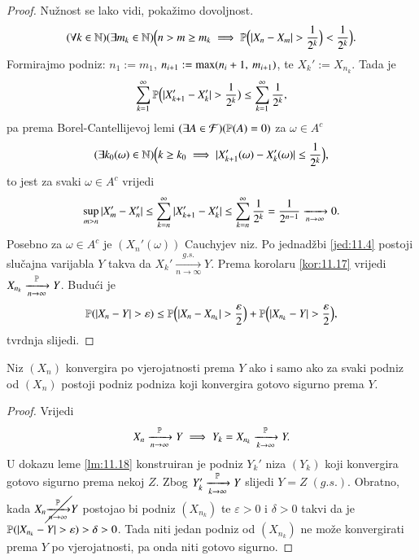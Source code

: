 \begin{proof}
    Nu\v znost se lako vidi, poka\v zimo dovoljnost.
    \begin{equation*}
        (\forall k \in \nat)(\exists m_k \in \nat)\Big(n > m \geq m_k \implies \masP \Big( |X_n - X_m|>\frac{1}{2^k} \Big) < \frac{1}{2^k} \Big).
    \end{equation*}
    Formirajmo podniz: $n_1 := m_1$, $n_{i + 1} := \max ({n_i + 1}, \: {m_{i + 1}})$, te $X_k' := X_{n_k}$.
    Tada je
    \begin{equation*}
        \sum\limits_{k = 1}^{\infty} \mathbb{P} \Big( |X_{k + 1}' - X_k'| > \frac{1}{2^k} \big) \leq \sum\limits_{k = 1}^{\infty} \frac{1}{2^k},    
    \end{equation*}
    pa prema Borel-Cantellijevoj lemi $(\exists A \in \mathcal{F}) (\mathbb{P}({A}) = 0)$ za $\omega \in A^c$
    \begin{equation*}
        (\exists k_0 (\omega) \in \mathbb{N}) \Big(k \geq k_0 \implies |X_{k + 1}'(\omega) - X_k' (\omega)| \leq \frac{1}{2^k} \Big),
    \end{equation*}
    to jest za svaki $\omega \in A^c$ vrijedi
    \begin{equation*}
        \sup\limits_{m > n} |X_m' - X_n'| \leq \sum\limits_{k = n}^{\infty} |X_{k + 1}' - X_k'| \leq \sum\limits_{k = n}^{\infty} \frac{1}{2^k} = \frac{1}{2^{n - 1}} \xrightarrow[n \to \infty]{} 0.
    \end{equation*}
    Posebno za $\omega \in A^c$ je $(X_n' (\omega))$ Cauchyjev niz.
    Po jednad\v zbi \eqref{jed:11.4} postoji slu\v cajna varijabla $Y$ takva da $X_k' \xrightarrow[n \to \infty]{g.s.} Y$.
    Prema korolaru \ref{kor:11.17} vrijedi $X_{n_k} \xrightarrow[n \to \infty]{\mathbb{P}} Y$.
    Budu\' ci je
    \begin{equation*}
        \mathbb{P}({|X_n - Y| > \varepsilon}) \leq \mathbb{P} \Big(  |X_n - X_{n_k}| > \frac{\varepsilon}{2} \Big) + \mathbb{P} \Big( |X_{n_k} - Y| > \frac{\varepsilon}{2} \Big),    
    \end{equation*}
    tvrdnja slijedi. 
\end{proof}

\begin{tm} \label{tm:11.19}
    Niz $(X_n)$ konvergira po vjerojatnosti prema $Y$ ako i samo ako za svaki podniz od $(X_n)$ postoji podniz podniza koji konvergira gotovo sigurno prema $Y$.
\end{tm}

\begin{proof}
    Vrijedi
    \begin{equation*}
        X_n \xrightarrow[n \to \infty]{\mathbb{P}} Y \implies Y_k = X_{n_k} \xrightarrow[k \to \infty]{\mathbb{P}} Y.
    \end{equation*}
    U dokazu leme \ref{lm:11.18} konstruiran je podniz $Y_k'$ niza $(Y_k)$ koji konvergira gotovo sigurno prema nekoj $Z$.
    Zbog $Y_k' \xrightarrow[k \to \infty]{\mathbb{P}} Y$ slijedi $Y=Z \; (g.s.)$.
    Obratno, kada $X_n \cancel{\xrightarrow[n \to \infty]{\mathbb{P}}} Y$ postojao bi podniz $(X_{n_k})$ te $\varepsilon > 0$ i $\delta > 0$ takvi da je $\mathbb{P}({|X_{n_k} - Y| > \varepsilon}) > \delta > 0$.
    Tada niti jedan podniz od $(X_{n_k})$ ne mo\v ze konvergirati prema $Y$ po vjerojatnosti, pa onda niti gotovo sigurno.
\end{proof}

